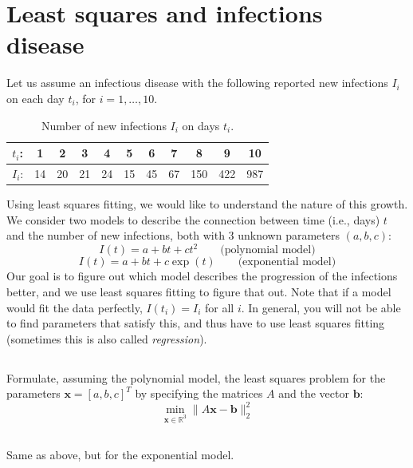 \documentclass[11pt,letterpaper]{article}
\begin{document}
\section{Least squares and infections disease}
Let us assume an infectious disease with the following reported new
infections $I_i$ on each day $t_i$, for $i=1,\ldots,10$.
\begin{table}[h]\centering
  \caption{Number of new infections $I_i$ on days $t_i$.}
  \begin{tabular}{c||c|c|c|c|c|c|c|c|c|c|}
\hline
$t_i$: & 1 & 2 & 3 & 4 & 5 & 6 & 7 & 8 & 9 & 10\\ \hline
$I_i$: & 14 & 20 & 21 & 24 & 15 & 45 & 67 & 150 & 422 & 987\\ \hline
\end{tabular}
\end{table}
Using least squares fitting, we would like to understand the nature of
this growth. We consider two models to describe the connection between
time (i.e., days) $t$ and the number of new infections, both with 3
unknown parameters $(a,b,c)$:
\begin{equation*}%
  I(t) = a + b t + c t^2 \qquad \text{(polynomial model)}
\end{equation*}
\begin{equation*}%
  I(t) = a + bt + c\exp(t) \qquad \text{(exponential model)}
\end{equation*}
Our goal is to figure out which model describes the progression of the
infections better, and we use least squares fitting to figure that
out. Note that if a model would fit the data perfectly, $I(t_i) = I_i$
for all $i$. In general, you will not be able to find parameters that
satisfy this, and thus have to use least squares fitting (sometimes
this is also called \emph{regression}).

\subsection{} Formulate, assuming the polynomial model, the least squares
  problem for the parameters $\boldsymbol x=[a,b,c]^T$ by specifying the
  matrices $A$ and the vector $\boldsymbol b$:
  $$ \min_{\boldsymbol x\in \mathbb R^3}\|A\boldsymbol x - \boldsymbol
  b \|_2^2
  $$

\subsection{}  Same as above, but for the exponential model.
\end{document}
